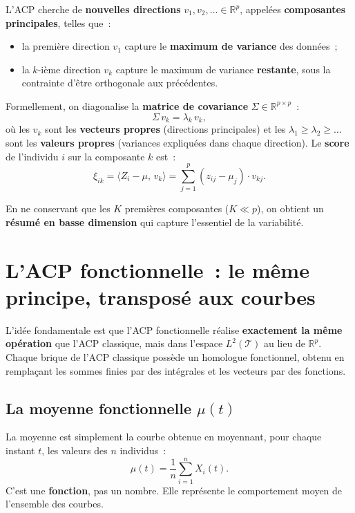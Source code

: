 \documentclass[11pt, a4paper]{article}
\newcommand{\R}{\mathbb{R}}
\newcommand{\Ltwo}{L^2(\mathcal{T})}
\begin{document}
L'ACP cherche de \textbf{nouvelles directions} $v_1, v_2, \ldots \in \R^p$, appel\'ees \textbf{composantes principales}, telles que~:
\begin{itemize}[nosep]
    \item la premi\`ere direction $v_1$ capture le \textbf{maximum de variance} des donn\'ees~;
    \item la $k$-i\`eme direction $v_k$ capture le maximum de variance \textbf{restante}, sous la contrainte d'\^etre orthogonale aux pr\'ec\'edentes.
\end{itemize}

Formellement, on diagonalise la \textbf{matrice de covariance} $\Sigma \in \R^{p \times p}$~:
\[
    \Sigma \, v_k = \lambda_k \, v_k,
\]
o\`u les $v_k$ sont les \textbf{vecteurs propres} (directions principales) et les $\lambda_1 \geq \lambda_2 \geq \ldots$ sont les \textbf{valeurs propres} (variances expliqu\'ees dans chaque direction). Le \textbf{score} de l'individu $i$ sur la composante $k$ est~:
\[
    \xi_{ik} = \langle Z_i - \mu, \, v_k \rangle = \sum_{j=1}^{p} (z_{ij} - \mu_j) \cdot v_{kj}.
\]

En ne conservant que les $K$ premi\`eres composantes ($K \ll p$), on obtient un \textbf{r\'esum\'e en basse dimension} qui capture l'essentiel de la variabilit\'e.

\section{L'ACP fonctionnelle~: le m\^eme principe, transpos\'e aux courbes}

L'id\'ee fondamentale est que l'ACP fonctionnelle r\'ealise \textbf{exactement la m\^eme op\'eration} que l'ACP classique, mais dans l'espace $\Ltwo$ au lieu de $\R^p$. Chaque brique de l'ACP classique poss\`ede un homologue fonctionnel, obtenu en rempla\c{c}ant les sommes finies par des int\'egrales et les vecteurs par des fonctions.

\subsection{La moyenne fonctionnelle $\mu(t)$}

La moyenne est simplement la courbe obtenue en moyennant, pour chaque instant $t$, les valeurs des $n$ individus~:
\[
    \mu(t) = \frac{1}{n} \sum_{i=1}^{n} X_i(t).
\]
C'est une \textbf{fonction}, pas un nombre. Elle repr\'esente le comportement moyen de l'ensemble des courbes.
\end{document}
